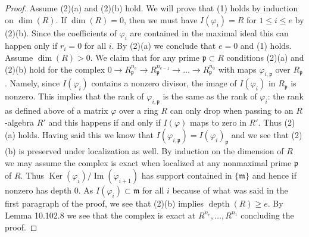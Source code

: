 \begin{proof}
Assume (2)(a) and (2)(b) hold. We will prove that (1) holds by induction on $\dim(R)$. If $\dim(R)=0$, then we must have $I(\varphi_i)=R$ for $1\leq i\leq e$ by (2)(b). Since the coefficients of $\varphi_i$ are contained in the maximal ideal this can happen only if $r_i=0$ for all $i$. By (2)(a) we conclude that $e=0$ and (1) holds. Assume $\dim(R)>0$. We claim that for any prime $\mathfrak p\subset R$ conditions (2)(a) and (2)(b) hold for the complex $0\to R_{\mathfrak p}^{n_e}\to R_{\mathfrak p}^{n_{e-1}}\to\ldots\to R_{\mathfrak p}^{n_0}$ with maps $\varphi_{i,\mathfrak p}$ over $R_{\mathfrak p}$. Namely, since $I(\varphi_i)$ contains a nonzero divisor, the image of $I(\varphi_i)$ in $R_{\mathfrak p}$ is nonzero. This implies that the rank of $\varphi_{i,\mathfrak p}$ is the same as the rank of $\varphi_i$: the rank as defined above of a matrix $\varphi$ over a ring $R$ can only drop when passing to an $R$-algebra $R'$ and this happens if and only if $I(\varphi)$ maps to zero in $R'$. Thus (2)(a) holds. Having said this we know that $I(\varphi_{i,\mathfrak p})=I(\varphi_i)_{\mathfrak p}$ and we see that (2)(b) is preserved under localization as well. By induction on the dimension of $R$ we may assume the complex is exact when localized at any nonmaximal prime $\mathfrak p$ of $R$. Thus $\operatorname{Ker}(\varphi_i)/\operatorname{Im}(\varphi_{i+1})$ has support contained in $\{\mathfrak m\}$ and hence if nonzero has depth $0$. As $I(\varphi_i)\subset\mathfrak m$ for all $i$ because of what was said in the first paragraph of the proof, we see that (2)(b) implies $\operatorname{depth}(R)\geq e$. By Lemma 10.102.8 we see that the complex is exact at $R^{n_e},\ldots,R^{n_1}$ concluding the proof.
\end{proof}

